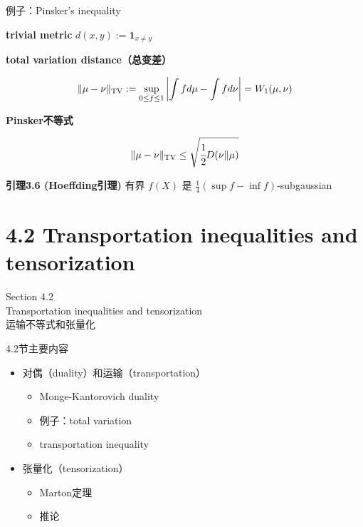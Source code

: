 \documentclass{beamer}
\begin{document}
\begin{frame}{例子：Pinsker's inequality}

\textbf{trivial metric} $d(x, y) := \mathbf{1}_{x\neq y}$

\textbf{total variation distance（总变差）}

$$
\|\mu-\nu\|_{\rm TV} := \sup_{0\le f\le 1} \left|\int fd\mu - \int fd\nu\right| = W_1(\mu, \nu)
$$

\textbf{Pinsker不等式}

$$
\|\mu-\nu\|_{\rm TV} \le \sqrt{\cfrac{1}{2}D(\nu\|\mu)}
$$

\textbf{引理3.6 (Hoeffding引理)} 有界 $f(X)$ 是 $\frac{1}{4}(\sup f - \inf f)$-subgaussian
    
\end{frame}

\section{4.2 Transportation inequalities and tensorization}

\begin{frame}
\begin{center}
\Large Section 4.2 \\ Transportation inequalities and tensorization \\ 运输不等式和张量化
\end{center}
\end{frame}

\begin{frame}{4.2节主要内容}

\begin{itemize}
    \item 对偶（duality）和运输（transportation）
    \begin{itemize}
        \item Monge-Kantorovich duality
        \item 例子：total variation
        \item transportation inequality
    \end{itemize}
    
    \item 张量化（tensorization）
    \begin{itemize}
        \item Marton定理
        \item 推论
    \end{itemize}
\end{itemize}

\end{frame}
\end{document}
